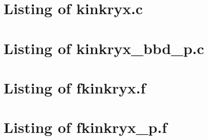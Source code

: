 
\lstset{language=C}

\newpage
\section{Listing of kinkryx.c}\label{s:kinkryx_c}

\newpage
\section{Listing of kinkryx\_bbd\_p.c}\label{s:kinkryx_bbd_p_c}


\lstset{language=[77]Fortran}

\newpage
\section{Listing of fkinkryx.f}\label{s:fkinkryx_f}

\newpage
\section{Listing of fkinkryx\_p.f}\label{s:fkinkryx_p_f}


